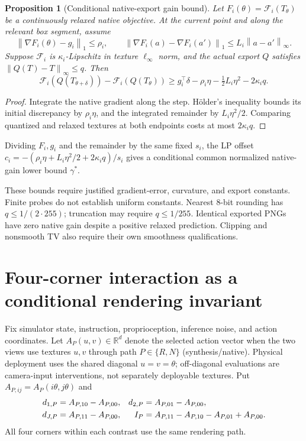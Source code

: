 \documentclass[10pt,a4paper]{article}
\newtheorem{proposition}{Proposition}[section]
\newcommand{\R}{\mathbb R}
\newcommand{\norm}[1]{\left\|#1\right\|}
\begin{document}
\begin{proposition}[Conditional native-export gain bound]\label{prop:native}
Let $F_i(\theta)=\mathcal F_i(T_\theta)$ be a continuously relaxed native
objective. At the current point and along the relevant box segment, assume
\[
 \norm{\nabla F_i(\theta)-g_i}_1\leq\rho_i,\qquad
 \norm{\nabla F_i(a)-\nabla F_i(a')}_1\leq L_i\norm{a-a'}_\infty.
\]
Suppose $\mathcal F_i$ is $\kappa_i$-Lipschitz in texture $\ell_\infty$ norm,
and the actual export $Q$ satisfies $\norm{Q(T)-T}_\infty\leq q$. Then
\begin{equation}\label{eq:nativebound}
 \mathcal F_i(Q(T_{\theta+\delta}))-\mathcal F_i(Q(T_\theta))
 \geq g_i^\top\delta-\rho_i\eta-\tfrac12L_i\eta^2-2\kappa_iq.
\end{equation}
\end{proposition}
\begin{proof}
Integrate the native gradient along the step. H\"older's inequality bounds its
initial discrepancy by $\rho_i\eta$, and the integrated remainder by
$L_i\eta^2/2$. Comparing quantized and relaxed textures at both endpoints costs
at most $2\kappa_iq$.
\end{proof}
Dividing $F_i,g_i$ and the remainder by the same fixed $s_i$, the LP offset
$c_i=-(\rho_i\eta+L_i\eta^2/2+2\kappa_iq)/s_i$ gives a conditional common
normalized native-gain lower bound $\gamma^*$.

These bounds require justified gradient-error, curvature, and export constants.
Finite probes do not establish uniform constants. Nearest 8-bit rounding has
$q\leq1/(2\cdot255)$; truncation may require $q\leq1/255$. Identical exported
PNGs have zero native gain despite a positive relaxed prediction. Clipping and
nonsmooth TV also require their own smoothness qualifications.

\newpage
\section{Four-corner interaction as a conditional rendering invariant}
Fix simulator state, instruction, proprioception, inference noise, and action
coordinates. Let $A_P(u,v)\in\R^d$ denote the selected action vector when the
two views use textures $u,v$ through path $P\in\{R,N\}$ (synthesis/native).
Physical deployment uses the shared diagonal $u=v=\theta$; off-diagonal
evaluations are camera-input interventions, not separately deployable textures.
Put $A_{P,ij}=A_P(i\theta,j\theta)$ and
\begin{align}
 d_{1,P}&=A_{P,10}-A_{P,00},&
 d_{2,P}&=A_{P,01}-A_{P,00},\notag\\
 d_{J,P}&=A_{P,11}-A_{P,00},&
 I_P&=A_{P,11}-A_{P,10}-A_{P,01}+A_{P,00}.\label{eq:corners}
\end{align}
All four corners within each contrast use the same rendering path.
\end{document}
